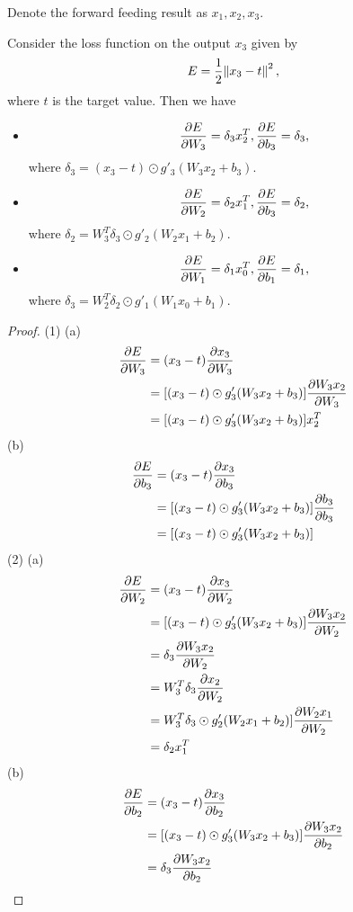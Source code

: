 \begin{refsection}
\begin{lemma}
Denote the forward feeding result as $x_1,x_2,x_3$.

Consider the loss function on the output $x_3$ given by
$$E=\frac{1}{2}\norm{x_3-t}^2,$$
where $t$ is the target value. Then we have
\begin{itemize}
	\item 
	$$\frac{\partial E}{\partial W_3} = \delta_3 x_2^T, \frac{\partial E}{\partial b_3} = \delta_3,$$
	where $\delta_3 = (x_3-t)\odot g'_3(W_3x_2 +b_3)$.
	\item 	
		$$\frac{\partial E}{\partial W_2} = \delta_2 x_1^T, \frac{\partial E}{\partial b_3} = \delta_2,$$
	where $\delta_2 = W_3^T\delta_3\odot g'_2(W_2x_1+b_2)$.
	\item 
		$$\frac{\partial E}{\partial W_1} = \delta_1 x_0^T, \frac{\partial E}{\partial b_1} = \delta_1,$$
	where $\delta_3 = W_2^T\delta_2\odot g'_1(W_1x_0+b_1)$.
\end{itemize}
\end{lemma}
\begin{proof}
(1)	(a)
\begin{align*}
\frac{\partial E}{\partial W_3} &= (x_3-t)\frac{\partial x_3}{\partial W_3} \\
&= [(x_3-t)\odot g'_3(W_3x_2 + b_3)]\frac{\partial W_3x_2}{\partial W_3} \\
&= [(x_3-t)\odot g'_3(W_3x_2+b_3)]x_2^T 
\end{align*}
(b) 
\begin{align*}
\frac{\partial E}{\partial b_3} &= (x_3-t)\frac{\partial x_3}{\partial b_3} \\
&= [(x_3-t)\odot g'_3(W_3x_2 + b_3)]\frac{\partial b_3}{\partial b_3} \\
&= [(x_3-t)\odot g'_3(W_3x_2+b_3)] 
\end{align*}
(2)
(a)
\begin{align*}
\frac{\partial E}{\partial W_2} &= (x_3-t)\frac{\partial x_3}{\partial W_2} \\
&= [(x_3-t)\odot g'_3(W_3x_2 + b_3)]\frac{\partial W_3x_2}{\partial W_2} \\
&= \delta_3\frac{\partial W_3x_2}{\partial W_2} \\
&= W_3^T\delta_3\frac{\partial x_2}{\partial W_2} \\
&= W_3^T\delta_3\odot g_2'(W_2x_1+b_2)]\frac{\partial W_2x_1}{\partial W_2} \\
&= \delta_2x_1^T
\end{align*}
(b)
\begin{align*}
\frac{\Pa E}{\Pa b_2} &= (x_3-t)\frac{\Pa x_3}{\Pa b_2} \\
&= [(x_3-t)\odot g'_3(W_3x_2 + b_3)]\frac{\Pa W_3x_2}{\Pa b_2} \\
&= \delta_3\frac{\Pa W_3x_2}{\Pa b_2} \\

\end{align*}
\end{proof}
\end{refsection}
